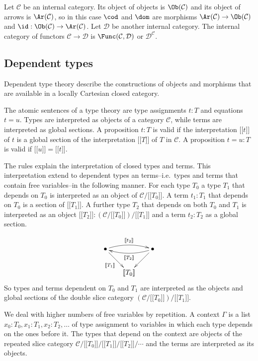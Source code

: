 \documentclass{tac}
\newcommand\hide[1]{}
\newcommand\cat\mathcal
\newcommand\of{:}
\newcommand\db[1]{{[\![}#1{]\!]}}
\begin{document}
Let $\cat C$ be an internal category. Its object of objects is $\Ob(\cat C)$ and its object of arrows is $\Ar(\cat C)$, so in this case $\cod$ and $\dom$ are morphisms $\Ar(\cat C)\to\Ob(\cat C)$ and $\id\of\Ob(\cat C)\to\Ar(\cat C)$. Let $\cat D$ be another internal category. The internal category of functors $\cat C\to\cat D$ is $\Func(\cat C,\cat D)$ or $\cat D^{\cat C}$.

\subsection{Dependent types}
Dependent type theory describe the constructions of objects and morphisms that are available in a locally Cartesian closed category.

The atomic sentences of a type theory are type assignments $t\of T$ and equations $t=u$. Types are interpreted as objects of a category $\cat C$, while terms are interpreted as global sections. A proposition $t\of T$ is valid if the interpretation $\db t$ of $t$ is a global section of the interpretation $\db T$ of $T$ in $\cat C$. A proposition $t=u\of T$ is valid if $\db u=\db t$. 

The rules explain the interpretation of closed types and terms. This interpretation extend to dependent types an terms--i.e.\ types and terms that contain free variables--in the following manner. For each type $T_0$ a type $T_1$ that depends on $T_0$ is interpreted as an object of $\cat C/\db{T_0}$. A term $t_1\of T_1$ that depends on $T_0$ is a section of $\db{T_1}$. A further type $T_2$ that depends on both $T_0$ and $T_1$ is interpreted as an object $\db{T_2}\of(\cat C/\db{T_0})/\db{T_1}$ and a term $t_2\of T_2$ as a global section.
\hide{\[\xymatrix{
& \bullet\ar[dl]^{\db{T_2}}\ar[d]\\ 
\bullet\ar[r]_{\db{T_1}}\ar@/^/[ur]^{\db{t_2}} & \db{T_0}
}\]}
\[\xy
(0,12)*+{\bullet} = "top left",(24,12)*+{\bullet} = "top right",(12,0)*+{\db{T_0}} = "bottom"
\ar "top right";"bottom" \ar_{\db{T_1}} "top left";"bottom" 
\ar@/^/@{->}^{\db{T_2}} "top right";"top left"
\ar@/^/@{->}^{\db{t_2}} "top left";"top right"
\endxy\]
So types and terms dependent on $T_0$ and $T_1$ are interpreted as the objects and global sections of the double slice category $(\cat C/\db{T_0})/\db{T_1}$.

We deal with higher numbers of free variables by repetition. A context $\Gamma$ is a list $x_0\of T_0,x_1\of T_1,x_2\of T_2,\dots$ of type assignment to variables in which each type depends on the ones before it. The types that depend on the context are objects of the repeated slice category $\cat C/\db{T_0}/\db{T_1}/\db{T_2}/\dotsm$ and the terms are interpreted as its objects. 
\end{document}
